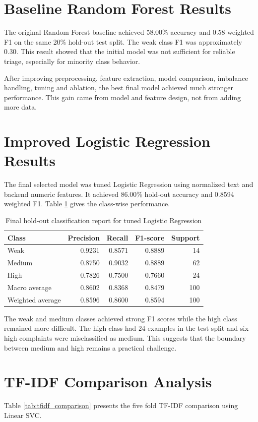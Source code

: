 \documentclass[12pt,a4paper,openany]{book}
\begin{document}
\section{Baseline Random Forest Results}
The original Random Forest baseline achieved 58.00\% accuracy and 0.58 weighted F1 on the same 20\% hold-out test split. The weak class F1 was approximately 0.30. This result showed that the initial model was not sufficient for reliable triage, especially for minority class behavior.

After improving preprocessing, feature extraction, model comparison, imbalance handling, tuning and ablation, the best final model achieved much stronger performance. This gain came from model and feature design, not from adding more data.

\section{Improved Logistic Regression Results}
The final selected model was tuned Logistic Regression using normalized text and backend numeric features. It achieved 86.00\% hold-out accuracy and 0.8594 weighted F1. Table \ref{tab:final_report} gives the class-wise performance.

\begin{table}[H]
\centering
\caption{Final hold-out classification report for tuned Logistic Regression}
\label{tab:final_report}
\begin{tabular}{lrrrr}
\toprule
\textbf{Class} & \textbf{Precision} & \textbf{Recall} & \textbf{F1-score} & \textbf{Support}\\
\midrule
Weak & 0.9231 & 0.8571 & 0.8889 & 14\\
Medium & 0.8750 & 0.9032 & 0.8889 & 62\\
High & 0.7826 & 0.7500 & 0.7660 & 24\\
\midrule
Macro average & 0.8602 & 0.8368 & 0.8479 & 100\\
Weighted average & 0.8596 & 0.8600 & 0.8594 & 100\\
\bottomrule
\end{tabular}
\end{table}

The weak and medium classes achieved strong F1 scores while the high class remained more difficult. The high class had 24 examples in the test split and six high complaints were misclassified as medium. This suggests that the boundary between medium and high remains a practical challenge.

\section{TF-IDF Comparison Analysis}
Table \ref{tab:tfidf_comparison} presents the five fold TF-IDF comparison using Linear SVC.
\end{document}
